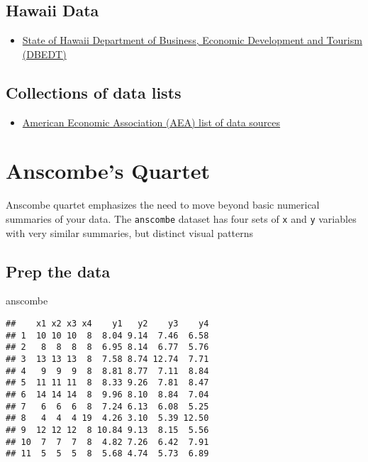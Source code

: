 \documentclass[]{book}
\newenvironment{Shaded}{\begin{snugshade}}{\end{snugshade}}
\newcommand{\NormalTok}[1]{{#1}}
\providecommand{\tightlist}{%
  \setlength{\itemsep}{0pt}\setlength{\parskip}{0pt}}
\theoremstyle{definition}
\theoremstyle{definition}
\theoremstyle{remark}
\begin{document}
\section*{Hawaii Data}\label{hawaii-data}

\begin{itemize}
\tightlist
\item
  \href{http://dbedt.hawaii.gov/economic/databook/}{State of Hawaii
  Department of Business, Economic Development and Tourism (DBEDT)}
\end{itemize}

\section*{Collections of data lists}\label{collections-of-data-lists}

\begin{itemize}
\tightlist
\item
  \href{https://www.aeaweb.org/resources/data}{American Economic
  Association (AEA) list of data sources}
\end{itemize}

\hypertarget{anscombe}{\chapter*{Anscombe's Quartet}\label{anscombe}}

Anscombe quartet emphasizes the need to move beyond basic numerical
summaries of your data. The \texttt{anscombe} dataset has four sets of
\texttt{x} and \texttt{y} variables with very similar summaries, but
distinct visual patterns

\section*{Prep the data}\label{prep-the-data}

\begin{Shaded}
\begin{Highlighting}[]
\NormalTok{anscombe}
\end{Highlighting}
\end{Shaded}

\begin{verbatim}
##    x1 x2 x3 x4    y1   y2    y3    y4
## 1  10 10 10  8  8.04 9.14  7.46  6.58
## 2   8  8  8  8  6.95 8.14  6.77  5.76
## 3  13 13 13  8  7.58 8.74 12.74  7.71
## 4   9  9  9  8  8.81 8.77  7.11  8.84
## 5  11 11 11  8  8.33 9.26  7.81  8.47
## 6  14 14 14  8  9.96 8.10  8.84  7.04
## 7   6  6  6  8  7.24 6.13  6.08  5.25
## 8   4  4  4 19  4.26 3.10  5.39 12.50
## 9  12 12 12  8 10.84 9.13  8.15  5.56
## 10  7  7  7  8  4.82 7.26  6.42  7.91
## 11  5  5  5  8  5.68 4.74  5.73  6.89
\end{verbatim}
\end{document}

